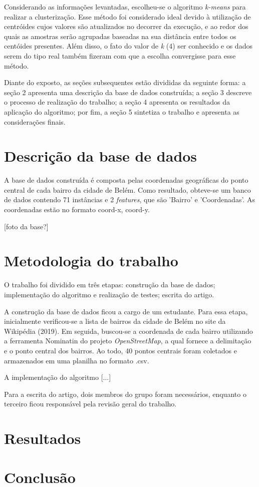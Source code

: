 \documentclass[12pt]{article}
\begin{document}
Considerando as informações levantadas, escolheu-se o algoritmo \textit{k-means} para realizar a clusterização. Esse método foi considerado ideal devido à utilização de centróides cujos valores são atualizados no decorrer da execução, e ao redor dos quais as amostras serão agrupadas baseadas na sua distância entre todos os centóides presentes. Além disso, o fato do valor de \textit {k} (4) ser conhecido e os dados serem do tipo real também fizeram com que a escolha convergisse para esse método.

Diante do exposto, as seções subsequentes estão divididas da seguinte forma: a seção 2 apresenta uma descrição da base de dados construída; a seção 3 descreve o processo de realização do trabalho; a seção 4 apresenta os resultados da aplicação do algoritmo; por fim, a seção 5 sintetiza o trabalho e apresenta as considerações finais.






\section{Descrição da base de dados}
A base de dados construída é composta pelas coordenadas geográficas do ponto central de cada bairro da cidade de Belém. Como resultado, obteve-se um banco de dados contendo 71 instâncias e 2 \textit{features}, que são 'Bairro' e 'Coordenadas'. As coordenadas estão no formato coord-x, coord-y.



[foto da base?]

\section{Metodologia do trabalho}
O trabalho foi dividido em três etapas: construção da base de dados; implementação do algoritmo e realização de testes; escrita do artigo.

A construção da base de dados ficou a cargo de um estudante. Para essa etapa, inicialmente verificou-se a lista de bairros da cidade de Belém no site da Wikipédia (2019). Em seguida, buscou-se a coordenada de cada bairro utilizando a ferramenta Nominatin do projeto \textit{OpenStreetMap}, a qual fornece a delimitação e o ponto central dos bairros. Ao todo, 40 pontos centrais foram coletados e armazenados em uma planilha no formato .csv.

A implementação do algoritmo [...]

Para a escrita do artigo, dois membros do grupo foram necessários, enquanto o terceiro ficou responsável pela revisão geral do trabalho. 

\section{Resultados}



\section{Conclusão}




\end{document}
